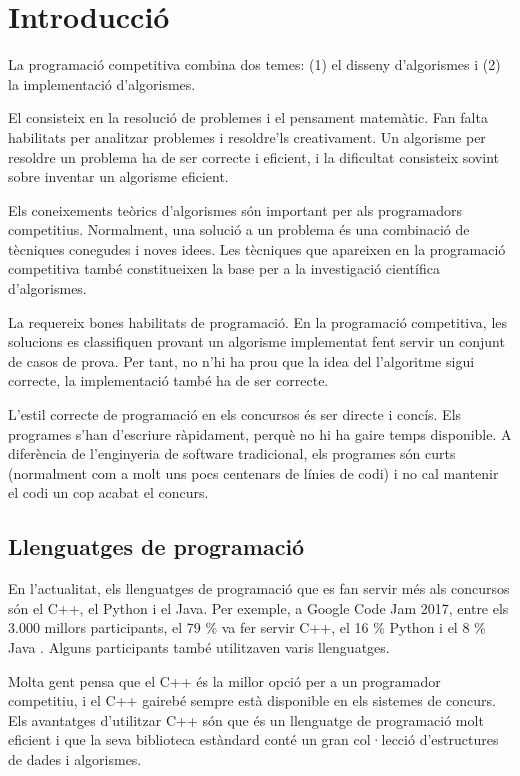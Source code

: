 \chapter{Introducció}

La programació competitiva combina dos temes:
(1) el disseny d'algorismes i (2) la implementació d'algorismes.

El  consisteix en la resolució de problemes
i el pensament matemàtic.
Fan falta habilitats per analitzar problemes i resoldre'ls
creativament.
Un algorisme per resoldre un problema
ha de ser correcte i eficient,
i la dificultat consisteix sovint
sobre inventar un algorisme eficient.

Els coneixements teòrics d'algorismes
s\'on important per als programadors competitius.
Normalment, una solució a un problema és
una combinació de tècniques conegudes i
noves idees.
Les tècniques que apareixen en la programació competitiva
també constitueixen la base per a la investigació científica
d'algorismes.

La  requereix bones
habilitats de programació.
En la programació competitiva, les solucions
es classifiquen provant un algorisme implementat
fent servir un conjunt de casos de prova.
Per tant, no n'hi ha prou que la idea del
l'algoritme sigui correcte, la implementació també
ha de ser correcte.

L'estil correcte de programaci\'o en els concursos és
ser directe i concís.
Els programes s'han d'escriure ràpidament,
perquè no hi ha gaire temps disponible.
A diferència de l'enginyeria de software tradicional,
els programes són curts (normalment com a molt uns pocs
centenars de línies de codi) i no cal mantenir el
codi un cop acabat el concurs.

\section{Llenguatges de programació}


En l'actualitat, els llenguatges de programaci\'o que
es fan servir més als concursos s\'on
el C++, el Python i el Java.
Per exemple, a Google Code Jam 2017,
entre els 3.000 millors participants,
el 79 \% va fer servir C++,
el 16 \% Python i
el 8 \% Java \cite{goo17}.
Alguns participants també utilitzaven varis llenguatges.

Molta gent pensa que el C++ és la millor opció
per a un programador competitiu,
i el C++ gairebé sempre està disponible en els
sistemes de concurs.
Els avantatges d'utilitzar C++ són que
és un llenguatge de programaci\'o molt eficient i
que la seva biblioteca estàndard conté un
gran col·lecció d'estructures de dades i algorismes.

